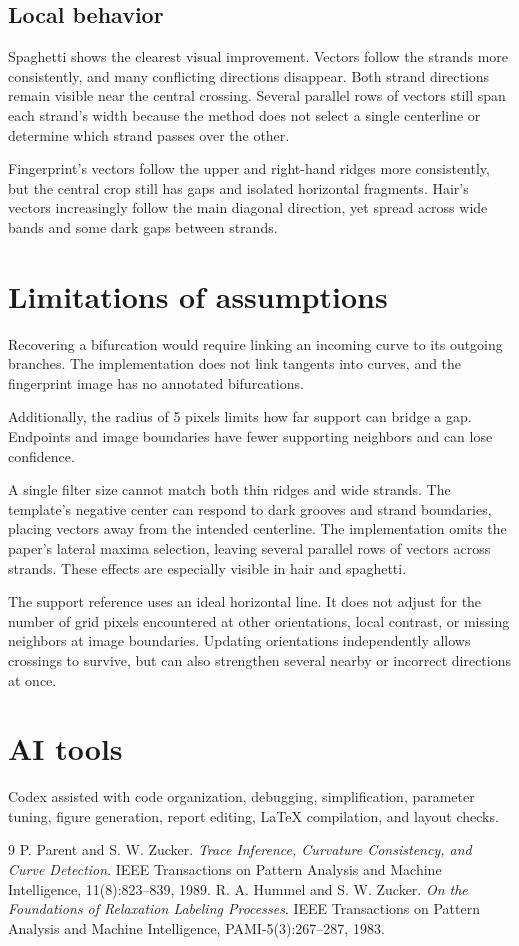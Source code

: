 \documentclass[10pt,letterpaper]{article}
\begin{document}
\subsection{Local behavior}


Spaghetti shows the clearest visual improvement. Vectors follow the strands
more consistently, and many conflicting directions disappear. Both strand
directions remain visible near the central crossing. Several parallel rows
of vectors still span each strand's width because the method does not select
a single centerline or determine which strand passes over the other.

Fingerprint's vectors follow the upper and right-hand ridges more consistently,
but the central crop still has gaps and isolated horizontal fragments. Hair's
vectors increasingly follow the main diagonal direction, yet spread across
wide bands and some dark gaps between strands.

\section{Limitations of assumptions}

Recovering a bifurcation would require linking an incoming curve to its
outgoing branches. The implementation does not link tangents into curves,
and the fingerprint image has no annotated bifurcations.

Additionally, the radius of 5 pixels limits how far support can bridge a gap. Endpoints
and image boundaries have fewer supporting neighbors and can lose confidence.

A single filter size cannot match both thin ridges and wide strands. The
template's negative center can respond to dark grooves and strand boundaries,
placing vectors away from the intended centerline. The implementation omits
the paper's lateral maxima selection, leaving several parallel rows of
vectors across strands. These effects are especially visible in hair and
spaghetti.

The support reference uses an ideal horizontal line. It does not adjust for
the number of grid pixels encountered at other orientations, local contrast,
or missing neighbors at image boundaries. Updating orientations independently
allows crossings to survive, but can also strengthen several nearby or
incorrect directions at once.

\section{AI tools}
Codex assisted with code organization, debugging, simplification, parameter
tuning, figure generation, report editing, LaTeX compilation, and layout checks.


\begin{thebibliography}{9}
P. Parent and S. W. Zucker.
\textit{Trace Inference, Curvature Consistency, and Curve Detection}.
IEEE Transactions on Pattern Analysis and Machine Intelligence,
11(8):823--839, 1989.
R. A. Hummel and S. W. Zucker.
\textit{On the Foundations of Relaxation Labeling Processes}.
IEEE Transactions on Pattern Analysis and Machine Intelligence,
PAMI-5(3):267--287, 1983.
\end{thebibliography}
\end{document}
